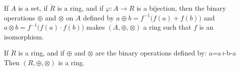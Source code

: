 \documentclass{article}                                                        %
\begin{document}
                \begin{theorem}
                    If $A$ is a set, if $\ring{R}$ is a ring, and if
                    $\varphi:A\rightarrow{R}$ is a bijection, then the binary
                    operations $\oplus$ and $\otimes$ on $A$ defined by
                    $a\oplus{b}=f^{\minus{1}}\big(f(a)+f(b)\big)$ and
                    $a\otimes{b}=f^{\minus{1}}\big(f(a)\cdot{f}(b)\big)$ makes
                    $(A,\oplus,\otimes)$ a ring such that $f$ is an isomorphism.
                \end{theorem}
                \begin{theorem}
                    If $\ring{R}$ is a ring, and if $\oplus$ and $\otimes$ are
                    the binary operations defined by:
                                {a=a+b-a}
                    Then $(R,\oplus,\otimes)$ is a ring.
                \end{theorem}
\end{document}
